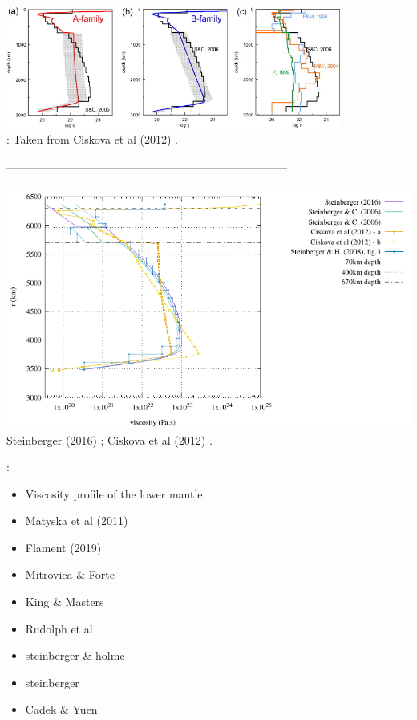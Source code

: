 \begin{center}
\includegraphics[width=11cm]{images/viscosity_profile/civs12-fig1}\\
{\captionfont \twothousandtwelve: Taken from Ciskova et al (2012) \cite{civs12}.}
\end{center}



---------------------------------------------------------------------------

\begin{center}
\includegraphics[width=14cm]{images/viscosity_profile/profiles}\\
{\captionfont Steinberger (2016) \cite{stei16}; 
Ciskova et al (2012) \cite{civs12}.}
\end{center}


\Literature:
\begin{itemize} 
\item Viscosity profile of the lower mantle \cite{elss85}
\item Matyska et al (2011) \cite{mayw11}
\item Flament (2019) \cite{flam19}
\item Mitrovica \& Forte \cite{mifo04}
\item King \& Masters \cite{kima92}
\item Rudolph et al \cite{rull15}
\item steinberger \& holme \cite{stho08}
\item steinberger \cite{stei16}
\item Cadek \& Yuen \cite{cayu93}
\end{itemize} 
